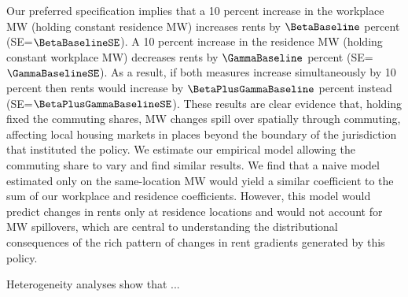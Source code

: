 
Our preferred specification implies that 
a 10 percent increase in the workplace MW (holding constant residence MW) 
increases rents by $\BetaBaseline$ percent (SE=$\BetaBaselineSE$).
A 10 percent increase in the residence MW (holding constant workplace MW) 
decreases rents by $\GammaBaseline$ percent (SE=$\GammaBaselineSE$). 
As a result, if both measures increase simultaneously by 10 percent then 
rents would increase by $\BetaPlusGammaBaseline$ percent instead (SE=$\BetaPlusGammaBaselineSE$).
These results are clear evidence that, holding fixed the commuting shares, MW 
changes spill over spatially through commuting, affecting local housing markets 
in places beyond the boundary of the jurisdiction that instituted the policy.
We estimate our empirical model allowing the commuting share to vary and find 
similar results.
We find that a naive model estimated only on the same-location MW would yield a 
similar coefficient to the sum of our workplace and residence coefficients.
However, this model would predict changes in rents only at residence locations 
and would not account for MW spillovers, which are central to understanding the 
distributional consequences of the rich pattern of changes in rent gradients
generated by this policy.

Heterogeneity analyses show that ...



